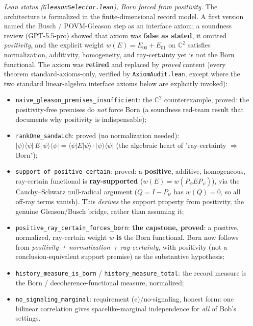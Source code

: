 \documentclass[11pt,a4paper]{article}
\begin{document}
\emph{Lean status (\texttt{GleasonSelector.lean}), Born forced from positivity.} The architecture is formalized in the finite-dimensional record model. A first version named the Busch / POVM-Gleason step as an interface axiom; a soundness review (GPT-5.5-pro) showed that axiom was \textbf{false as stated}, it omitted \emph{positivity}, and the explicit weight $w(E) = E_{00} + E_{01}$ on $\mathbb{C}^2$ satisfies normalization, additivity, homogeneity, and ray-certainty yet is not the Born functional. The axiom was \textbf{retired} and replaced by \emph{proved} content (every theorem standard-axioms-only, verified by \texttt{AxiomAudit.lean}, except where the two standard linear-algebra interface axioms below are explicitly invoked):
\begin{itemize}
  \item \texttt{naive\_gleason\_premises\_insufficient}: the $\mathbb{C}^2$ counterexample, proved: the positivity-free premises do \emph{not} force Born (a soundness red-team result that documents why positivity is indispensable);
  \item \texttt{rankOne\_sandwich}: proved (no normalization needed): $|\psi\rangle\langle\psi|\, E\, |\psi\rangle\langle\psi| = \langle\psi|E|\psi\rangle \cdot |\psi\rangle\langle\psi|$ (the algebraic heart of "ray-certainty $\Rightarrow$ Born");
  \item \texttt{support\_of\_positive\_certain}: proved: a \textbf{positive}, additive, homogeneous, ray-certain functional is \textbf{ray-supported} ($w(E) = w(P_\psi E P_\psi)$), via the Cauchy–Schwarz null-radical argument ($Q = I - P_\psi$ has $w(Q) = 0$, so all off-ray terms vanish). This \emph{derives} the support property from positivity, the genuine Gleason/Busch bridge, rather than assuming it;
  \item \texttt{positive\_ray\_certain\_forces\_born}: \textbf{the capstone, proved}: a positive, normalized, ray-certain weight $w$ \textbf{is} the Born functional. Born now follows from \emph{positivity + normalization + ray-certainty}, with positivity (not a conclusion-equivalent support premise) as the substantive hypothesis;
  \item \texttt{history\_measure\_is\_born} / \texttt{history\_measure\_total}: the record measure is the Born / decoherence-functional measure, normalized;
  \item \texttt{no\_signaling\_marginal}: requirement (e)/no-signaling, honest form: one bilinear correlation gives spacelike-marginal independence for \emph{all} of Bob's settings.
\end{itemize}
\end{document}
